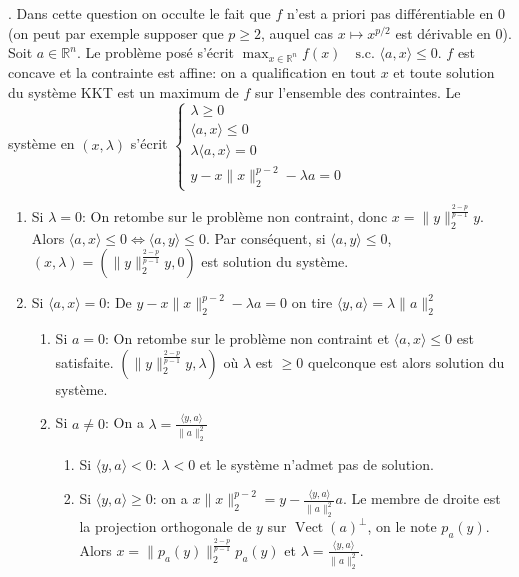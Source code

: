 \documentclass{report}
\DeclareMathOperator{\Vect}{Vect}
\begin{document}
. Dans cette question on occulte le fait que $f$ n'est a priori pas différentiable en $0$ (on peut par exemple supposer que $p\geq 2$, auquel cas $x\mapsto x^{p/2}$ est dérivable en $0$).\newline
Soit $a\in \mathbb R^n$. Le problème posé s'écrit $\max_{x\in \mathbb R^n} f(x) \quad \text{s.c. } \langle a,x\rangle \leq 0$.\newline
\newline 
$f$ est concave et la contrainte est affine: on a qualification en tout $x$ et toute solution du système KKT est un maximum de $f$ sur l'ensemble des contraintes. Le système en $(x,\lambda)$ s'écrit $\begin{cases}
\lambda \geq 0 \\
\langle a,x \rangle \leq 0 \\
\lambda \langle a,x \rangle =0 \\
y-x \|x\|_2^{p-2} - \lambda a =0
\end{cases}$\newline
\begin{enumerate}
\item Si $\lambda =0$:\newline
On retombe sur le problème non contraint, donc $x=\|y\|_2^{\frac{2-p}{p-1}}y$.\newline
Alors $\langle a,x \rangle \leq 0 \iff \langle a,y \rangle \leq 0$. Par conséquent, si $\langle a,y \rangle \leq 0$,\newline  $(x,\lambda)=(\|y\|_2^{\frac{2-p}{p-1}}y,0)$ est solution du système. \newline
\item Si $\langle a,x\rangle =0$: \newline
De $y-x \|x\|_2^{p-2} - \lambda a =0$ on tire $\langle y,a \rangle = \lambda \|a\|_2^2$
\begin{enumerate}
\item Si $a=0$: On retombe sur le problème non contraint et $\langle a,x \rangle \leq 0$ est satisfaite. $(\|y\|_2^{\frac{2-p}{p-1}}y,\lambda)$ où $\lambda$ est $\geq 0$ quelconque est alors solution du système. \newline
\item Si $a\neq 0$: On a $\lambda =  \frac{\langle y,a \rangle}{\|a\|_2^2} $
\begin{enumerate}
\item Si $\langle y,a \rangle<0$: $\lambda <0$ et le système n'admet pas de solution.
\item Si $\langle y,a \rangle\geq 0$: on a $x\|x\|_2^{p-2} = y -\frac{\langle y,a \rangle}{\|a\|_2^2} a $. Le membre de droite est la projection orthogonale de $y$ sur $\Vect(a)^\bot$, on le note $p_a(y)$.\newline
Alors $x=\|p_a(y)\|_2^{\frac{2-p}{p-1}} p_a(y)$ et $\lambda =  \frac{\langle y,a \rangle}{\|a\|_2^2} $.
\end{enumerate}
\end{enumerate}
\end{enumerate}
\end{document}

